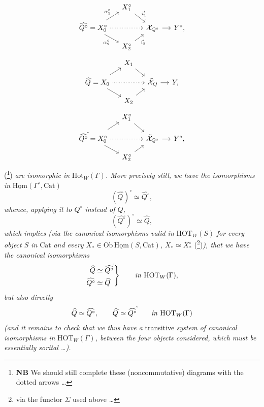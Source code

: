 \documentclass[11pt]{article}
\newcommand{\printedpage}[1]{\marginpar{\footnotesize p.~#1}}
\newcommand{\msp}[1]{\marginpar{\footnotesize [#1]}}
\newcommand{\Cat}{\mathrm{Cat}}
\newcommand{\uHom}{\underline{\mathrm{Hom}}}
\newcommand{\HOT}{\mathrm{HOT}}
\newcommand{\Hot}{\mathrm{Hot}}
\newcommand{\tld}{^{\tilde{}}}
\begin{document}
\setcounter{footnote}{90}

\printedpage{98}
\[
\begin{tikzcd}[row sep=small, column sep=small]
 & X_1^\circ \arrow[dr,"i^{\prime}_{1}"] & & \\
\widehat{Q^\circ} = X_0^\circ \arrow[ur,"\alpha_1^\circ"] \arrow[dr,"\alpha_2^\circ"'] \arrow[rr,dotted] & & \mathcal{X}_{Q^\circ} \arrow[r] & Y^\circ, \\
 & X_2^\circ \arrow[ur,"i^{\prime}_{2}"'] & &
\end{tikzcd}
\]
\[
\begin{tikzcd}[row sep=small, column sep=small]
 & X_1 \arrow[dr] & & \\
\widehat{Q}\tld = X_0 \arrow[ur] \arrow[dr] \arrow[rr,dotted] & & \tilde{\mathcal{X}}_{Q} \arrow[r] & Y, \\
 & X_2 \arrow[ur] & &
\end{tikzcd}
\]
\[
\begin{tikzcd}[row sep=small, column sep=small]
 & X_1^\circ \arrow[dr] & & \\
\widehat{Q^\circ}\tld = X_0^\circ \arrow[ur] \arrow[dr] \arrow[rr,dotted] & & \tilde{\mathcal{X}}_{Q^\circ} \arrow[r] & Y^\circ, \\
 & X_2^\circ \arrow[ur] & &
\end{tikzcd}
\]
(\footnote{\textbf{NB} We should still complete these (noncommutative) diagrams with the dotted arrows \dots}) \textit{are isomorphic in} $\Hot_W(\Gamma)$\textit{. More precisely still, we have the isomorphisms in} $\uHom(\Gamma^\circ,\Cat)$
\[
(\widehat{Q}\tld)^\circ \simeq \widehat{Q^\circ},
\]
\textit{whence, applying it to $Q^\circ$ instead of $Q$,}
\[
(\widehat{Q^\circ}\tld)^\circ \simeq \widehat{Q},
\]
\textit{which implies (via the canonical isomorphisms valid in} $\HOT_W(S)$ \textit{for every object $S$ in} $\Cat$ \textit{and every} $X_* \in \mathrm{Ob}\,\uHom(S,\Cat)$\textit{,} $X_* \simeq X_*^\circ$ (\footnote{via the functor $\Sigma$ used above \dots})\textit{), that we have the canonical isomorphisms}
\[
\left.\begin{aligned}
\widehat{Q} &\simeq \widehat{Q^\circ}\tld \\
\widehat{Q^\circ} &\simeq \widehat{Q}\tld
\end{aligned}\right\}
\qquad \text{\textit{in} } \HOT_W(\Gamma),
\]
\textit{but also directly}
\[
\widehat{Q} \simeq \widehat{Q^\circ}, \qquad \widehat{Q}\tld \simeq \widehat{Q^\circ}\tld \qquad \text{\textit{in} } \HOT_W(\Gamma)
\]
\msp{page 143}\textit{(and it remains to check that we thus have a} transitive \textit{system of canonical isomorphisms in} $\HOT_W(\Gamma)$\textit{, between the four objects considered, which must be essentially sorital \dots).}
\end{document}

